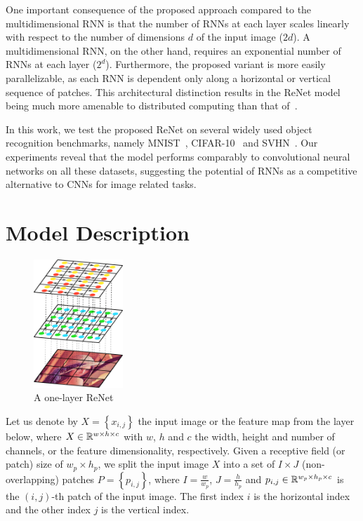 One important consequence of the proposed approach compared to the
multidimensional RNN is that the number of RNNs at each layer scales linearly
with respect to the number of dimensions $d$ of the input image ($2d$). A
multidimensional RNN, on the other hand, requires an exponential number of RNNs
at each layer ($2^d$). Furthermore, the proposed variant is more easily
parallelizable, as each RNN is dependent only along a horizontal or vertical
sequence of patches. This architectural distinction results in the ReNet model
being much more amenable to distributed computing than that
of~\citet{Graves+Schmidhuber-2009}.

In this work, we test the proposed ReNet on several widely used object
recognition benchmarks, namely  MNIST~\citep{Lecun99objectrecognition},
CIFAR-10~\citep{KrizhevskyHinton2009} and SVHN~\citep{Netzer-wkshp-2011}. Our
experiments reveal that the model performs comparably to convolutional neural
networks on all these datasets,
suggesting the potential of RNNs as a competitive alternative to CNNs for image
related tasks.
\vfill

\section{Model Description}

\begin{figure}
    \centering
    \includegraphics[width=0.3\textwidth]{pdf/renet_first_layer.pdf}
    \caption{A one-layer ReNet}
    \label{fig:networklayer}
    \vspace{-3mm}
\end{figure}

Let us denote by $X=\left\{x_{i,j}\right\}$ the input image or the feature map
from the layer below, where $X \in \mathbb{R}^{w \times h \times c}$ with $w$, $h$ and
$c$ the width, height and number of channels, or the feature dimensionality,
respectively. Given a receptive field (or patch) size of $w_p \times h_p$, we
split the input image $X$ into a set of $I \times J$ (non-overlapping) patches
$P = \left\{ p_{i,j} \right\}$, where $I = \frac{w}{w_p}$, $J = \frac{h}{h_p}$
and $p_{i,j} \in \mathbb{R}^{w_p \times h_p \times c}$ is the $(i,j)$-th patch of the
input image. The first index $i$ is the horizontal index and the other index
$j$ is the vertical index.

